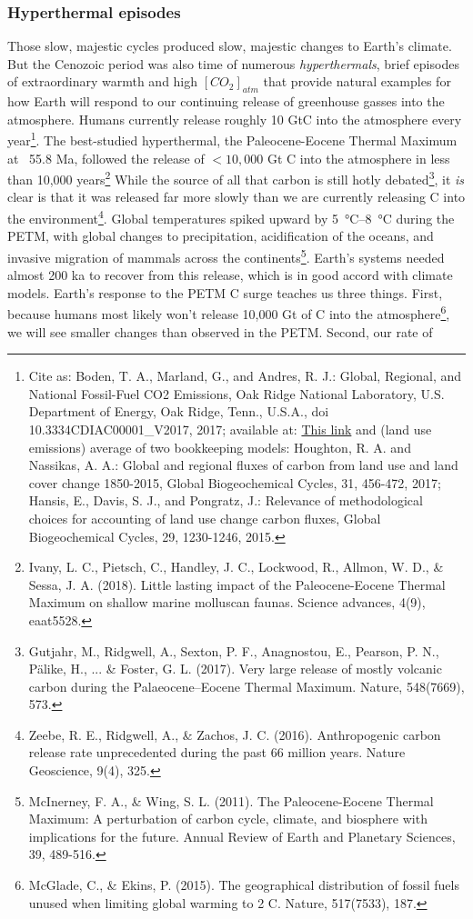\documentclass[amstex,12pt]{book}
\begin{document}
\subsubsection{Hyperthermal episodes}
Those slow, majestic cycles produced slow, majestic changes to Earth's climate. But the Cenozoic period was also time of numerous \emph{hyperthermals}, brief episodes of extraordinary warmth and high $[CO_2]_{atm}$ that provide natural examples for how Earth will respond to our continuing release of greenhouse gasses into the atmosphere. Humans currently release roughly 10 GtC into the atmosphere every year\footnote{Cite as: Boden, T. A., Marland, G., and Andres, R. J.: Global, Regional, and National Fossil-Fuel CO2 Emissions, Oak Ridge National Laboratory, U.S. Department of Energy, Oak Ridge, Tenn., U.S.A., doi 10.3334\/CDIAC\/00001\_V2017, 2017; available at: \href{http://cdiac.ess-dive.lbl.gov/trends/emis/overview\_2014.html}{This link} and (land use emissions) average of two bookkeeping models: Houghton, R. A. and Nassikas, A. A.: Global and regional fluxes of carbon from land use and land cover change 1850-2015, Global Biogeochemical Cycles, 31, 456-472, 2017;  Hansis, E., Davis, S. J., and Pongratz, J.: Relevance of methodological choices for accounting of land use change carbon fluxes, Global Biogeochemical Cycles, 29, 1230-1246, 2015.}. The best-studied hyperthermal, the Paleocene-Eocene Thermal Maximum at ~55.8 Ma, followed the release of $<10,000$ Gt C into the atmosphere in less than 10,000 years\footnote{Ivany, L. C., Pietsch, C., Handley, J. C., Lockwood, R., Allmon, W. D., \& Sessa, J. A. (2018). Little lasting impact of the Paleocene-Eocene Thermal Maximum on shallow marine molluscan faunas. Science advances, 4(9), eaat5528.} While the source of all that carbon is still hotly debated\footnote{Gutjahr, M., Ridgwell, A., Sexton, P. F., Anagnostou, E., Pearson, P. N., Pälike, H., ... \& Foster, G. L. (2017). Very large release of mostly volcanic carbon during the Palaeocene–Eocene Thermal Maximum. Nature, 548(7669), 573.}, it \emph{is} clear is that it was released far more slowly than we are currently releasing C into the environment\footnote{Zeebe, R. E., Ridgwell, A., \& Zachos, J. C. (2016). Anthropogenic carbon release rate unprecedented during the past 66 million years. Nature Geoscience, 9(4), 325.}. Global temperatures spiked upward by \SIrange{5}{8}{\celsius} during the PETM, with global changes to precipitation, acidification of the oceans, and invasive migration of mammals across the continents\footnote{McInerney, F. A., \& Wing, S. L. (2011). The Paleocene-Eocene Thermal Maximum: A perturbation of carbon cycle, climate, and biosphere with implications for the future. Annual Review of Earth and Planetary Sciences, 39, 489-516.}. Earth's systems needed almost 200 ka to recover from this release, which is in good accord with climate models. Earth's response to the PETM C surge teaches us three things. First, because humans most likely won't release 10,000 Gt of C into the atmosphere\footnote{McGlade, C., \& Ekins, P. (2015). The geographical distribution of fossil fuels unused when limiting global warming to 2 C. Nature, 517(7533), 187.}, we will see smaller changes than observed in the PETM. Second, our rate of 
\end{document}
